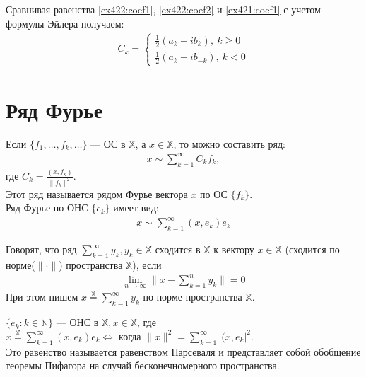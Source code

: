 \begin{remark}
  Сравнивая равенства \eqref{ex422:coef1}, \eqref{ex422:coef2} и
  \eqref{ex421:coef1} с учетом формулы Эйлера получаем:
  \begin{gather}
    C_k =
    \begin{cases}
      \frac{1}{2} (a_k - ib_k), \ k \geq 0 \\
      \frac{1}{2} (a_k + ib_{-k}), \ k < 0
    \end{cases}
    \label{rm423:cases1}
  \end{gather}
\end{remark}

\section{Ряд Фурье}
\label{ch43}
\begin{definition}
  Если $\{f_1, \dots, f_k, \dots\}$ --- ОС в $\mathbb{X}$, а $x \in
  \mathbb{X}$, то можно составить ряд:
  \begin{gather*}
    x \sim \sum\limits_{k = 1}^{\infty} C_k f_k,
  \end{gather*}
  где $C_k = \frac{(x, f_k)}{\|f_k\|^2}$. \\
  Этот ряд называется рядом Фурье вектора $x$ по ОС $\{f_k\}$. \\
  Ряд Фурье по ОНС $\{e_k\}$ имеет вид:
  \begin{gather*}
    x \sim \sum\limits_{k = 1}^{\infty} (x, e_k) e_k
  \end{gather*}
\end{definition}

\begin{definition}
  Говорят, что ряд $\sum\limits_{k = 1}^{\infty} y_k, y_k \in \mathbb{X}$
  сходится в $\mathbb{X}$ к вектору $x \in \mathbb{X}$ (сходится по
  норме($\|\cdot\|$) пространства $\mathbb{X}$), если
  \begin{gather*}
    \lim\limits_{n \to \infty} \|x - \sum\limits_{k = 1}^{n} y_k\| = 0
  \end{gather*}
  При этом пишем $x \overset{\mathbb{X}}= \sum\limits_{k = 1}^{\infty}
  y_k$ по норме пространства $\mathbb{X}$.
\end{definition}

\begin{theorem}
  \label{th431}
  $\{e_k: k \in \mathbb{N}\}$ --- ОНС в $\mathbb{X}, x \in \mathbb{X}$, где \\
  $x \overset{\mathbb{X}} = \sum\limits_{k = 1}^{\infty} (x, e_k) e_k
  \Longleftrightarrow$ когда $\|x\|^2 = \sum\limits_{k = 1}^{\infty} |(x,
  e_k|^2$. \\
  Это равенство называется равенством Парсеваля и представляет собой обобщение
  теоремы Пифагора на случай бесконечномерного пространства.
\end{theorem}

